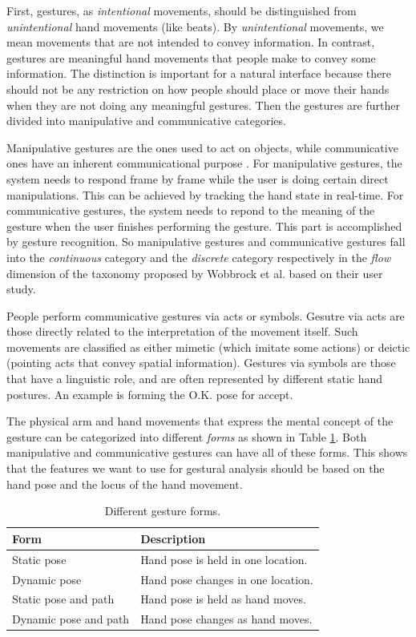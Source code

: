 First, gestures, as \textit{intentional} movements, should be distinguished from
\textit{unintentional} hand movements (like beats). By \textit{unintentional}
movements, we mean movements that are not intended to convey information. In
contrast, gestures are meaningful hand movements that people make to convey some
information. The distinction is important for a natural interface because there
should not be any restriction on how people should place or move their hands
when they are not doing any meaningful gestures. Then the gestures are further 
divided into manipulative and communicative categories.

Manipulative gestures are the ones used to act on objects, while communicative 
ones have an inherent communicational purpose \cite{Pavlovic97}. For
manipulative gestures, the system needs to respond frame by frame while the user is doing
certain direct manipulations. This can be achieved by tracking the hand
state in real-time. For communicative gestures, the system needs to repond to
the meaning of the gesture when the user finishes performing the gesture. This part is
accomplished by gesture recognition. So manipulative gestures and communicative
gestures fall into the \textit{continuous} category and the
\textit{discrete} category respectively in the \textit{flow} dimension of the
taxonomy proposed by Wobbrock \cite{wobbrock09} et al. based on their
user study.

People perform communicative gestures via acts or symbols. Gesutre via acts are
those directly related to the interpretation of the movement itself. Such
movements are classified as either mimetic (which imitate some actions) or
deictic (pointing acts that convey spatial information). Gestures via symbols
are those that have a linguistic role, and are often represented by different static hand postures. An example is forming the
O.K. pose for accept. 

The physical arm and hand movements that express the mental concept of the
gesture can be categorized into different \textit{forms} \cite{wobbrock09} as
shown in Table \ref{tab:form}. Both manipulative and communicative gestures can
have all of these forms. This shows that the features we want to use for
gestural analysis should be based on the hand pose and the locus of the hand
movement.

\begin{table}[h]
  \centering
  \begin{tabular}{| l | l |}
  	\hline
  	\textbf{Form} 		  & \textbf{Description} \\ \hline 
  	Static pose  		  & Hand pose is held in one location. \\ \hline
  	Dynamic pose 		  & Hand pose changes in one location. \\ \hline
  	Static pose and path  & Hand pose is held as hand moves. \\ \hline
  	Dynamic pose and path & Hand pose changes as hand moves. \\ \hline
  \end{tabular}
  \caption{Different gesture forms.}
  \label{tab:form}
\end{table}


